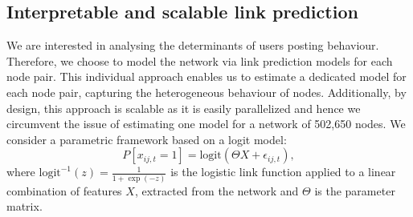 
\subsection{Interpretable and scalable link prediction} \label{sec:model_link}
We are interested in analysing the determinants of users posting behaviour. Therefore, we choose to model the network via link prediction models for each node pair. This individual approach enables us to estimate a dedicated model for each node pair, capturing the heterogeneous behaviour of nodes. Additionally, by design, this approach is scalable as it is easily parallelized and hence we circumvent the issue of estimating one model for a network of 502,650 nodes.  %
We consider a parametric framework based on a logit model: %
\begin{equation} \label{eq:modeleq}
	P[x_{ij,t}=1] =\text{logit}(\Theta X + \epsilon_{ij,t}), 
\end{equation}
where $\text{logit}^{-1}(z)=\frac{1}{1+\exp(-z)}$ is the logistic link function applied to a linear combination of features $X$, extracted from the network and $\Theta$ is the parameter matrix.
